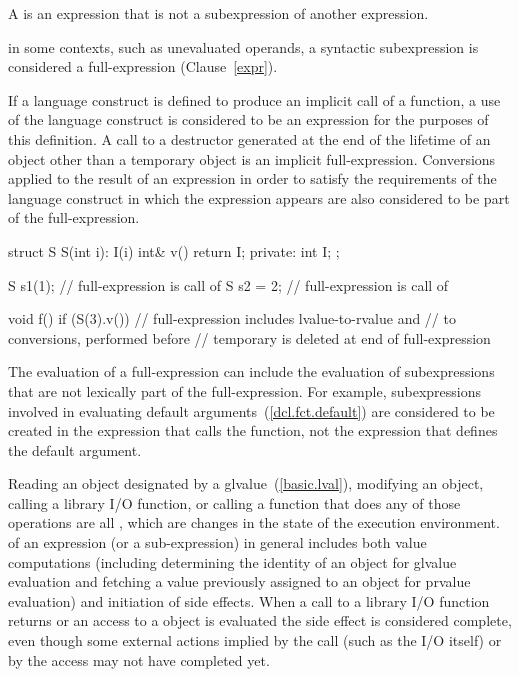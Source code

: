 \pnum
{}%
A  is an expression that is not a
subexpression of another expression.
\begin{note}
in some contexts, such as unevaluated operands, a syntactic
subexpression is considered a full-expression
(Clause~\ref{expr}).
\end{note}
If a language construct is defined
to produce an implicit call of a function, a use of the language
construct is considered to be an expression for the purposes of this
definition. A call to a destructor generated at the end of the lifetime
of an object other than a temporary object is an implicit
full-expression. Conversions applied to the result of an expression in
order to satisfy the requirements of the language construct in which the
expression appears are also considered to be part of the
full-expression.

\begin{example}
\begin{codeblock}
struct S {
  S(int i): I(i) { }
  int& v() { return I; }
private:
  int I;
};

 S s1(1);           // full-expression is call of 
 S s2 = 2;          // full-expression is call of 

void f() {
  if (S(3).v())     // full-expression includes lvalue-to-rvalue and
                    //  to  conversions, performed before
                    // temporary is deleted at end of full-expression
  { }
}
\end{codeblock}
\end{example}

\pnum
\begin{note} The evaluation of a full-expression can include the
evaluation of subexpressions that are not lexically part of the
full-expression. For example, subexpressions involved in evaluating
default arguments~(\ref{dcl.fct.default}) are considered to
be created in the expression that calls the function, not the expression
that defines the default argument. \end{note}

\pnum
{}%
Reading an object designated by a 
glvalue~(\ref{basic.lval}), modifying an object, calling a library I/O
function, or calling a function that does any of those operations are
all
, which are changes in the state of the execution
environment.  of an expression (or a
sub-expression) in general includes both value computations (including
determining the identity of an object for glvalue evaluation and fetching
a value previously assigned to an object for prvalue evaluation) and
initiation of side effects. When a call to a library I/O function
returns or an access to a  object is evaluated the side
effect is considered complete, even though some external actions implied
by the call (such as the I/O itself) or by the  access
may not have completed yet.

